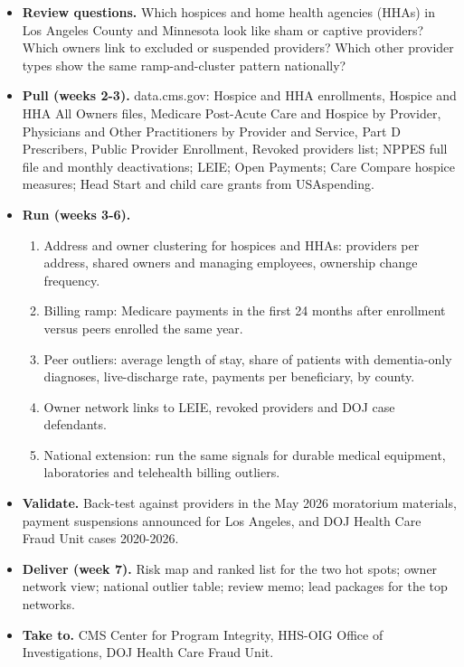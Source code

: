 \documentclass[letterpaper,11pt]{article}
\providecommand{\tightlist}{\setlength{\itemsep}{0pt}\setlength{\parskip}{0pt}}
\begin{document}
\begin{itemize}
\tightlist
\item
  \textbf{Review questions.} Which hospices and home health agencies
  (HHAs) in Los Angeles County and Minnesota look like sham or captive
  providers? Which owners link to excluded or suspended providers? Which
  other provider types show the same ramp-and-cluster pattern
  nationally?
\item
  \textbf{Pull (weeks 2-3).} data.cms.gov: Hospice and HHA enrollments,
  Hospice and HHA All Owners files, Medicare Post-Acute Care and Hospice
  by Provider, Physicians and Other Practitioners by Provider and
  Service, Part D Prescribers, Public Provider Enrollment, Revoked
  providers list; NPPES full file and monthly deactivations; LEIE; Open
  Payments; Care Compare hospice measures; Head Start and child care
  grants from USAspending.
\item
  \textbf{Run (weeks 3-6).}

  \begin{enumerate}
  \def\labelenumi{\arabic{enumi}.}
  \tightlist
  \item
    Address and owner clustering for hospices and HHAs: providers per
    address, shared owners and managing employees, ownership change
    frequency.
  \item
    Billing ramp: Medicare payments in the first 24 months after
    enrollment versus peers enrolled the same year.
  \item
    Peer outliers: average length of stay, share of patients with
    dementia-only diagnoses, live-discharge rate, payments per
    beneficiary, by county.
  \item
    Owner network links to LEIE, revoked providers and DOJ case
    defendants.
  \item
    National extension: run the same signals for durable medical
    equipment, laboratories and telehealth billing outliers.
  \end{enumerate}
\item
  \textbf{Validate.} Back-test against providers in the May 2026
  moratorium materials, payment suspensions announced for Los Angeles,
  and DOJ Health Care Fraud Unit cases 2020-2026.
\item
  \textbf{Deliver (week 7).} Risk map and ranked list for the two hot
  spots; owner network view; national outlier table; review memo; lead
  packages for the top networks.
\item
  \textbf{Take to.} CMS Center for Program Integrity, HHS-OIG Office of
  Investigations, DOJ Health Care Fraud Unit.
\end{itemize}
\end{document}
